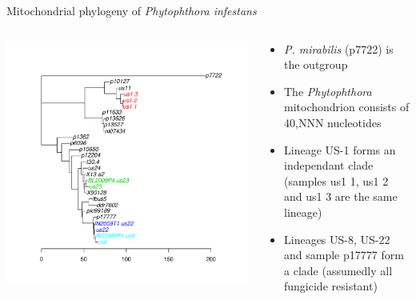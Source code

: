 \documentclass[final,t]{beamer}
\begin{document}
\begin{frame}{}
\begin{columns}[t]
\begin{column}{.4\linewidth}
\begin{block}{Mitochondrial phylogeny of \emph{Phytophthora infestans}}
        \begin{columns}[t]
          \begin{column}[T]{0.6\linewidth}
            \includegraphics[width=0.9\linewidth, height=1.2\linewidth]{chromR7.pdf}
          \end{column}
          \begin{column}[T]{0.4\linewidth}
            \begin{itemize}
              \item \emph{P. mirabilis} (p7722) is the outgroup
              \item The \emph{Phytophthora} mitochondrion consists of 40,NNN nucleotides
              \item Lineage US-1 forms an independant clade (samples us1 1, us1 2 and us1 3 are the same lineage)
              \item Lineages US-8, US-22 and sample p17777 form a clade (assumedly all fungicide resistant)
            \end{itemize}
          \end{column}
        \end{columns}
      \end{block}


\end{column}
\end{columns}
\end{frame}
\end{document}
